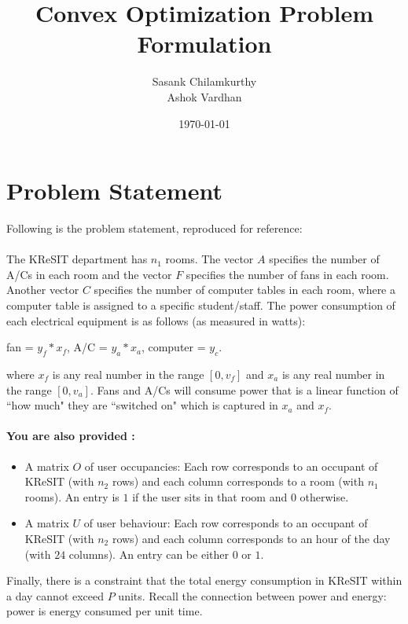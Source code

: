 \documentclass[a4paper]{article}
\begin{document}
\title{Convex Optimization Problem Formulation}
\author{Sasank Chilamkurthy \\Ashok Vardhan}
\date{\today}
\maketitle

\section{Problem Statement}
Following is the problem statement, reproduced for reference:
\\
\\
The KReSIT department has $n_1$ rooms. The vector $A$ specifies the number of A/Cs in each room and the vector $F$ specifies the number of fans in each room. Another vector $C$ specifies the number of computer tables in each room, where a computer table is assigned to a specific student/staff. The power consumption of each electrical equipment is as follows (as measured in watts):

fan = $y_f*x_f$, A/C = $y_a*x_a$, computer = $y_c$. 

where $x_f$ is any real number in the range $[0,v_f]$ and $x_a$ is any real number in the range $[0,v_a]$. Fans and A/Cs will consume power that is a linear function of ``how much" they are ``switched on" which is captured in $x_a$ and $x_f$. 

\paragraph*{\textnormal{You are also provided :}}
\begin{itemize}
\item A matrix $O$ of user occupancies: Each row corresponds to an occupant of KReSIT (with $n_2$ rows) and each column corresponds to a room (with $n_1$ rooms). An entry is $1$ if the user sits in that room and $0$ otherwise. 

\item A matrix $U$ of user behaviour: Each row corresponds to an occupant of KReSIT (with $n_2$ rows) and each column corresponds to an hour of the day (with $24$ columns). An entry can be either $0$ or $1$. 
\end{itemize}
Finally, there is a constraint that the total energy consumption in KReSIT within a day cannot exceed $P$ units. Recall the connection between power and energy: power is energy consumed per unit time. 
\end{document}
